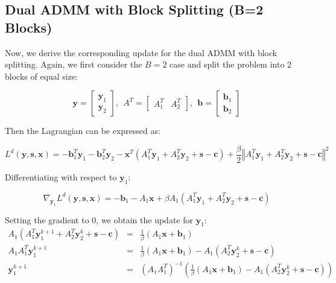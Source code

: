 \documentclass{article}
\begin{document}
\subsection*{Dual ADMM with Block Splitting (B=2 Blocks)}
Now, we derive the corresponding update for the dual ADMM with block splitting. Again, we first consider the $B=2$ case and split the problem into 2 blocks of equal size:

\[
\mathbf{y}=\begin{bmatrix}\mathbf{y}_{1}\\
\mathbf{y}_{2}
\end{bmatrix},
\ \
A^{T}=\begin{bmatrix}A_{1}^{T} & A_{2}^{T}\end{bmatrix},
\ \ 
\mathbf{b}=\begin{bmatrix}\mathbf{b}_{1}\\
\mathbf{b}_{2}
\end{bmatrix}
\]

Then the Lagrangian can be expressed as:

\[
L^{d}(\mathbf{y},\mathbf{s},\mathbf{x})=-\mathbf{b}_{1}^{T}\mathbf{y}_{1}-\mathbf{b}_{2}^{T}\mathbf{y}_{2}-\mathbf{x}^{T}\left(A_{1}^{T}\mathbf{y}_{1}+A_{2}^{T}\mathbf{y}_{2}+\mathbf{s}-\mathbf{c}\right)+\frac{\beta}{2}\left\Vert A_{1}^{T}\mathbf{y}_{1}+A_{2}^{T}\mathbf{y}_{2}+\mathbf{s}-\mathbf{c}\right\Vert ^{2}
\]


Differentiating with respect to $\mathbf{y}_{1}$:

\[
\nabla_{\mathbf{y}_{1}}L^{d}(\mathbf{y},\mathbf{s},\mathbf{x})=-\mathbf{b}_{1}-A_{1}\mathbf{x}+\beta A_{1}\left(A_{1}^{T}\mathbf{y}_{1}+A_{2}^{T}\mathbf{y}_{2}+\mathbf{s}-\mathbf{c}\right)
\]

Setting the gradient to 0, we obtain the update for $\mathbf{y}_{1}$:
\begin{eqnarray*}
A_{1}\left(A_{1}^{T}\mathbf{y}_{1}^{k+1}+A_{2}^{T}\mathbf{y}_{2}^{k}+\mathbf{s}-\mathbf{c}\right) & = & \frac{1}{\beta}\left(A_{1}\mathbf{x}+\mathbf{b}_{1}\right)\\
A_{1}A_{1}^{T}\mathbf{y}_{1}^{k+1} & = & \frac{1}{\beta}\left(A_{1}\mathbf{x}+\mathbf{b}_{1}\right)-A_{1}\left(A_{2}^{T}\mathbf{y}_{2}^{k}+\mathbf{s}-\mathbf{c}\right)\\
\mathbf{y}_{1}^{k+1} & = & \left(A_{1}A_{1}^{T}\right)^{-1}\left(\frac{1}{\beta}\left(A_{1}\mathbf{x}+\mathbf{b}_{1}\right)-A_{1}\left(A_{2}^{T}\mathbf{y}_{2}^{k}+\mathbf{s}-\mathbf{c}\right)\right)
\end{eqnarray*}
\end{document}
